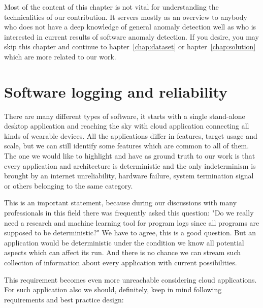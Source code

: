Most of the content of this chapter is not vital for understanding the technicalities of our contribution. It servers mostly as an overview to anybody who does not have a deep knowledge of general anomaly detection  well as who is interested in current results of software anomaly detection. If you desire, you may skip this chapter and continue to hapter~\ref{chap:dataset} or hapter~\ref{chap:solution} which are more related to our work.


\section{Software logging and reliability}

There are many different types of software, it starts with a single stand-alone desktop application and reaching the sky with cloud application connecting all kinds of wearable devices. All the applications differ in features, target usage and scale, but we can still identify some features which are common to all of them. The one we would like to highlight and have as ground truth to our work is that every application and architecture is deterministic and the only indeterminism is brought by an internet unreliability, hardware failure, system termination signal or others belonging to the same category.

This is an important statement, because during our discussions with many professionals in this field there was frequently asked this question: "Do we really need a research and machine learning tool for program logs since all programs are supposed to be deterministic?" We have to agree, this is a good question. But an application would be deterministic under the condition we know all potential aspects which can affect its run. And there is no chance we can stream such collection of information about every application with current possibilities.

This requirement becomes even more unreachable considering cloud applications. For such application also we should, definitely, keep in mind following requirements and best practice design:

